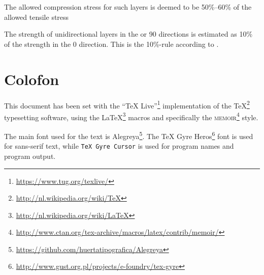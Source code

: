 \documentclass[a4paper,landscape,oneside,11pt,twocolumn]{memoir}
\begin{document}
The allowed compression stress for such layers is deemed to be 50\%--60\% of the
allowed tensile stress

The strength of unidirectional layers in the \textdegree{} or
90\textdegree{} directions is estimated as 10\% of the strength in the
0\textdegree{} direction. This is the 10\%-rule according to
\citet{1992WeiEn..52...29H}.

%

\chapter{Colofon}

This document has been set with the “TeX
Live”\footnote{\url{https://www.tug.org/texlive/}} implementation of the
\TeX\footnote{\url{http://nl.wikipedia.org/wiki/TeX}} typesetting software,
using the \LaTeX\footnote{\url{http://nl.wikipedia.org/wiki/LaTeX}} macros and
specifically the \textsc{memoir}\footnote{%
    \url{http://www.ctan.org/tex-archive/macros/latex/contrib/memoir/}} style.

The main font used for the text is
Alegreya\footnote{\url{https://github.com/huertatipografica/Alegreya}}.  The
\textsf{TeX Gyre
Heros}\footnote{\url{http://www.gust.org.pl/projects/e-foundry/tex-gyre}} font
is used for sans-serif text, while \texttt{TeX Gyre Cursor} is used for
program names and program output.
\end{document}
